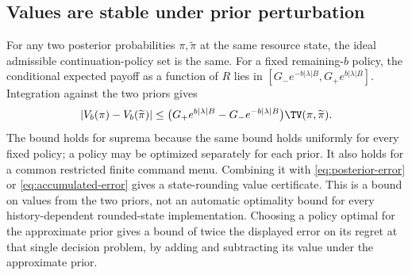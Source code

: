 \subsection{Values are stable under prior perturbation}
For any two posterior probabilities $\pi,\widetilde\pi$ at the same resource
state, the ideal admissible continuation-policy set is the same. For a
fixed remaining-$b$ policy, the conditional expected payoff as a function of
$R$ lies in $[G_-e^{-b|\lambda|B},G_+e^{b|\lambda|B}]$. Integration against
the two priors gives
\begin{equation}
 |V_b(\pi)-V_b(\widetilde\pi)|\le
 \bigl(G_+e^{b|\lambda|B}-G_-e^{-b|\lambda|B}\bigr)
                         \TV(\pi,\widetilde\pi).
 \label{eq:value-stability}
\end{equation}
The bound holds for suprema because the same bound holds uniformly for
every fixed policy; a policy may be optimized separately for each prior.
It also holds for a common restricted finite command menu. Combining it
with \eqref{eq:posterior-error} or \eqref{eq:accumulated-error} gives a
state-rounding value certificate. This is a bound on values from the two
priors, not an automatic optimality bound for every history-dependent
rounded-state implementation. Choosing a policy optimal for the approximate
prior gives a bound of twice the displayed error on its regret at that
single decision problem, by adding and subtracting its value under the
approximate prior.
